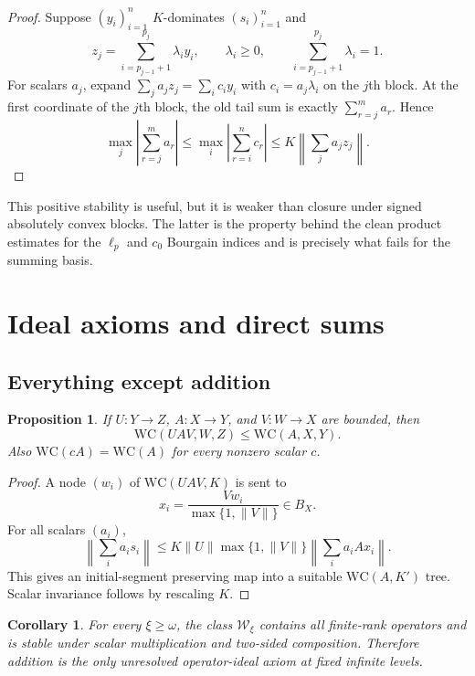\documentclass[11pt]{article}
\newtheorem{proposition}[theorem]{Proposition}
\newtheorem{corollary}[theorem]{Corollary}
\theoremstyle{definition}
\theoremstyle{remark}
\newcommand{\WC}{\mathrm{WC}}
\newcommand{\cW}{\mathcal W}
\begin{document}
\begin{proof}
Suppose $(y_i)_{i=1}^n$ $K$-dominates $(s_i)_{i=1}^n$ and
\[
   z_j=\sum_{i=p_{j-1}+1}^{p_j}\lambda_i y_i,
   \qquad \lambda_i\geq0,
   \qquad \sum_{i=p_{j-1}+1}^{p_j}\lambda_i=1.
\]
For scalars $a_j$, expand $\sum_j a_jz_j=\sum_i c_i y_i$ with $c_i=a_j\lambda_i$ on the $j$th block.  At the first coordinate of the $j$th block, the old tail sum is exactly $\sum_{r=j}^m a_r$.  Hence
\[
 \max_j\left|\sum_{r=j}^m a_r\right|
 \leq \max_i\left|\sum_{r=i}^n c_r\right|
 \leq K\left\|\sum_j a_jz_j\right\|.
\]
\end{proof}

This positive stability is useful, but it is weaker than closure under signed absolutely convex blocks.  The latter is the property behind the clean product estimates for the $\ell_p$ and $c_0$ Bourgain indices and is precisely what fails for the summing basis.

\section{Ideal axioms and direct sums}

\subsection{Everything except addition}

\begin{proposition}\label{prop:composition}
If $U:Y\to Z$, $A:X\to Y$, and $V:W\to X$ are bounded, then
\[
   \WC(UAV,W,Z)\leq\WC(A,X,Y).
\]
Also $\WC(cA)=\WC(A)$ for every nonzero scalar $c$.
\end{proposition}

\begin{proof}
A node $(w_i)$ of $\WC(UAV,K)$ is sent to
\[
   x_i=\frac{Vw_i}{\max\{1,\|V\|\}}\in B_X.
\]
For all scalars $(a_i)$,
\[
 \left\|\sum_i a_i s_i\right\|
 \leq K\|U\|\max\{1,\|V\|\}
       \left\|\sum_i a_iAx_i\right\|.
\]
This gives an initial-segment preserving map into a suitable $\WC(A,K')$ tree.  Scalar invariance follows by rescaling $K$.
\end{proof}

\begin{corollary}\label{cor:only-addition}
For every $\xi\geq\omega$, the class $\cW_\xi$ contains all finite-rank operators and is stable under scalar multiplication and two-sided composition.  Therefore addition is the only unresolved operator-ideal axiom at fixed infinite levels.
\end{corollary}
\end{document}
